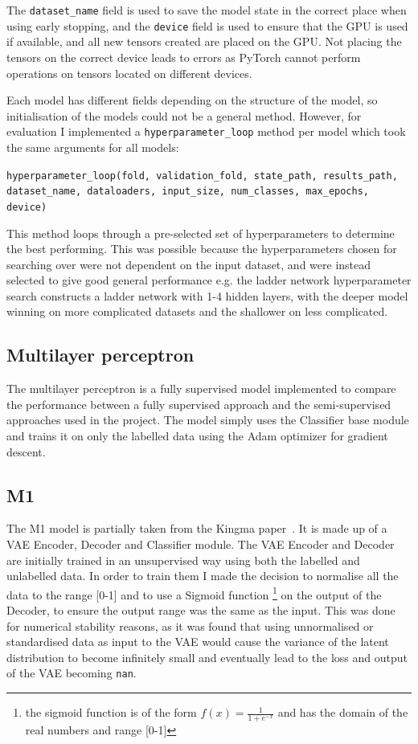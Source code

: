 The \texttt{dataset\_name} field is used to save the model state in the correct place when using early stopping, and the \texttt{device} field is 
used to ensure that the GPU is used if available, and all new tensors created are placed on the GPU. Not placing the tensors on the correct device 
leads to errors as PyTorch cannot perform operations on tensors located on different devices.

Each model has different fields depending on the structure of the model, so initialisation of the models could not be a general method. 
However, for evaluation I implemented a \texttt{hyperparameter\_loop} method per model 
which took the same arguments for all models:
\begin{center}
  \texttt{hyperparameter\_loop(fold, validation\_fold, state\_path, results\_path, dataset\_name, dataloaders, input\_size, num\_classes, max\_epochs, device)}
\end{center}

This method loops through a pre-selected set of hyperparameters to determine the best performing.
This was possible because the hyperparameters chosen for searching over were not dependent on the input dataset, and were instead selected 
to give good general performance e.g. the ladder network hyperparameter search constructs a ladder network with 1-4 hidden layers, with the 
deeper model winning on more complicated datasets and the shallower on less complicated.

\subsection{Multilayer perceptron}
The multilayer perceptron is a fully supervised model implemented to compare the performance between a fully supervised approach and the 
semi-supervised approaches used in the project. The model simply uses the Classifier base module and trains it on only the labelled data 
using the Adam optimizer for gradient descent.

\subsection{M1}
The M1 model is partially taken from the Kingma paper~\cite{DBLP:journals/corr/KingmaRMW14}. It is made up of a VAE Encoder,
Decoder and Classifier 
module. The VAE Encoder and Decoder are initially trained in an unsupervised way using both the labelled and unlabelled data. In order 
to train them I made the decision to normalise all the data to the range [0-1] and to use a Sigmoid function 
\footnote{the sigmoid function is of
the form $f(x) = \frac{1}{1+e^{-x}}$ and has the domain of the real numbers and range [0-1]} on the output of the Decoder, to ensure the output range 
was the same as the input. This was done for numerical stability reasons, as it was found that using unnormalised or standardised data 
as input to the VAE would cause the variance of the latent distribution to become infinitely small and eventually lead to the loss and 
output of the VAE becoming \texttt{nan}.

